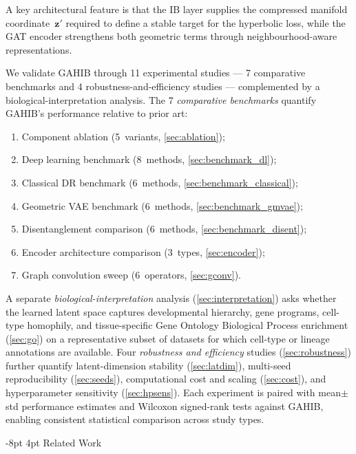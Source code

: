 \documentclass[preprint,12pt]{elsarticle}
\makeatletter
\renewcommand\section{\@startsection{section}{1}{\z@}%
  {-8pt \@plus -2pt \@minus -2pt}%
  {4pt \@plus 1pt \@minus 1pt}%
  {\normalfont\Large\bfseries}}
\newcommand{\bz}{\mathbf{z}}
\makeatother
\begin{document}
A key architectural feature is that the IB layer supplies the compressed
manifold coordinate~$\bz'$ required to define a stable target for the
hyperbolic loss, while the GAT encoder strengthens both geometric terms
through neighbourhood-aware representations.

We validate GAHIB through 11 experimental studies --- 7 comparative
benchmarks and 4 robustness-and-efficiency studies --- complemented by
a biological-interpretation analysis. The 7 \emph{comparative
benchmarks} quantify GAHIB's performance relative to prior art:
\begin{enumerate}[leftmargin=*,itemsep=0pt,label=(\roman*)]
\item Component ablation (5~variants, \cref{sec:ablation});
\item Deep learning benchmark (8~methods, \cref{sec:benchmark_dl});
\item Classical DR benchmark (6~methods, \cref{sec:benchmark_classical});
\item Geometric VAE benchmark (6~methods, \cref{sec:benchmark_gmvae});
\item Disentanglement comparison (6~methods, \cref{sec:benchmark_disent});
\item Encoder architecture comparison (3~types, \cref{sec:encoder});
\item Graph convolution sweep (6~operators, \cref{sec:gconv}).
\end{enumerate}
A separate \emph{biological-interpretation} analysis
(\cref{sec:interpretation}) asks whether the learned latent space
captures developmental hierarchy, gene programs, cell-type homophily,
and tissue-specific Gene Ontology Biological Process enrichment
(\cref{sec:go}) on a representative subset of datasets for which
cell-type or lineage annotations are available.
Four \emph{robustness and efficiency} studies
(\cref{sec:robustness}) further quantify latent-dimension stability
(\cref{sec:latdim}), multi-seed reproducibility (\cref{sec:seeds}),
computational cost and scaling (\cref{sec:cost}), and hyperparameter
sensitivity (\cref{sec:hpsens}).
Each experiment is paired with mean$\pm$std performance estimates and
Wilcoxon signed-rank tests against GAHIB, enabling consistent statistical
comparison across study types.


\section{Related Work}\label{sec:related}
\end{document}
